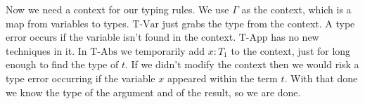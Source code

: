 \begin{frame}
\begin{mdframed}[frametitle={Typing rules}]
\begin{overprint}
\end{overprint}
\end{mdframed}
\medskip
\begin{overprint}
 Now we need a context for our typing rules.
 We use $\Gamma$ as the context, which is a map from variables to types.
 $\text{T-Var}$ just grabs the type from the context.
 A type error occurs if the variable isn't found in the context.
 $\text{T-App}$ has no new techniques in it.
 In $\text{T-Abs}$ we temporarily add $x {:} T_1$ to the context, just for long enough to find the type of $t$.
 If we didn't modify the context then we would risk a type error occurring if the variable $x$ appeared within the term $t$.
 With that done we know the type of the argument and of the result, so we are done.
\end{overprint}
\end{frame}

